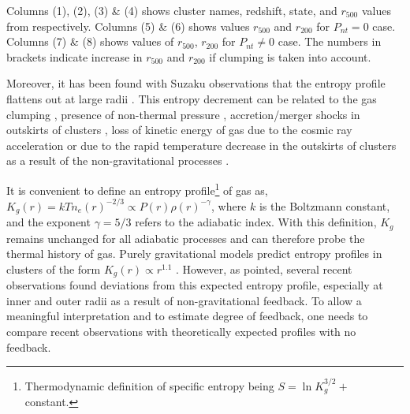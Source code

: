 \documentclass[a4paper,fleqn,usenatbib]{mnras}
\begin{document}
\begin{table*}
Columns (1), (2),  (3) \& (4) shows cluster names, redshift, state, and $r_{500}$ values from \cite{Planck2011} respectively.
Columns (5) \& (6) shows values $r_{500}$ and $r_{200}$ for $P_{nt}=0$ case. Columns (7) \& (8) shows values of $r_{500}$, $r_{200}$ for $P_{nt}\neq0$ case.\newline
The numbers in brackets indicate increase in  $r_{500}$ and $r_{200}$ if clumping is taken into account.
\end{table*}
 

 Moreover, it has been found with  Suzaku observations that the entropy profile flattens out at large radii \citep{Hoshino2010,Simionescu2011,Eckert2013a,Fujita2013}.
This entropy decrement can be related to the gas clumping \citep{Simionescu2011,Eckert2013a, Eckert2015}, presence of non-thermal pressure \citep{Femiano2014,Su2015}, accretion/merger shocks in outskirts of clusters \citep{Hoshino2010,Cavaliere2011}, loss of kinetic energy of gas due to the cosmic ray acceleration \citep{Fujita2013, Su2015} or due to the 
rapid temperature decrease in the outskirts of clusters as a result of the non-gravitational processes  \citep{Femiano2014}.


It is convenient to define an entropy profile\footnote{Thermodynamic definition of specific entropy being $S=\ln K_g^{3/2}+$ constant.} of gas as,
$K_g(r)=kTn_e(r)^{-2/3}\propto P(r)\rho(r)^{-\gamma}$, where $k$ is the Boltzmann constant, and the exponent $\gamma=5/3$ refers to  the adiabatic index. With this definition, $K_g$ remains unchanged for all adiabatic processes and can therefore probe  the thermal history of gas. 
Purely gravitational models predict entropy profiles in clusters of the form $K_g(r) \propto r^{1.1}$ \citep{Voit2005}. 
However, as pointed, several recent observations found deviations from this expected entropy profile, especially at inner and outer radii \citep{Voit2005,10,Cavagnolo2009,Eckert2013a} as a result of non-gravitational feedback. 
To allow a meaningful interpretation and to estimate degree of feedback,  one needs to compare recent observations with theoretically expected profiles with no feedback.
\end{document}
